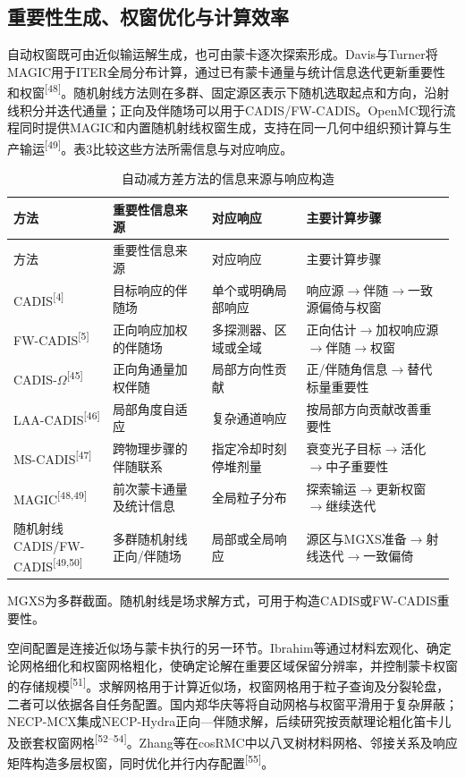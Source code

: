\documentclass[UTF8, zihao=-4, fontset=none, a4paper]{ctexart}
\newcommand{\upcite}[1]{\textsuperscript{[#1]}}
\begin{document}
\subsection{重要性生成、权窗优化与计算效率}

自动权窗既可由近似输运解生成，也可由蒙卡逐次探索形成。Davis与Turner将MAGIC用于ITER全局分布计算，通过已有蒙卡通量与统计信息迭代更新重要性和权窗\upcite{48}。随机射线方法则在多群、固定源区表示下随机选取起点和方向，沿射线积分并迭代通量；正向及伴随场可以用于CADIS/FW-CADIS。OpenMC现行流程同时提供MAGIC和内置随机射线权窗生成，支持在同一几何中组织预计算与生产输运\upcite{49}。表3比较这些方法所需信息与对应响应。 \begin{longtable}{@{}>{\raggedright\arraybackslash}p{0.22\linewidth}>{\raggedright\arraybackslash}p{0.22\linewidth}>{\raggedright\arraybackslash}p{0.21\linewidth}>{\raggedright\arraybackslash}p{0.33\linewidth}@{}}
\caption{自动减方差方法的信息来源与响应构造}\label{tab:3}\\
\toprule
方法 & 重要性信息来源 & 对应响应 & 主要计算步骤 \\
\midrule
\endfirsthead
\toprule
方法 & 重要性信息来源 & 对应响应 & 主要计算步骤 \\
\midrule
\endhead
\bottomrule
\endlastfoot
CADIS\upcite{4} & 目标响应的伴随场 & 单个或明确局部响应 & 响应源$\rightarrow$伴随$\rightarrow$一致源偏倚与权窗 \\
FW-CADIS\upcite{5} & 正向响应加权的伴随场 & 多探测器、区域或全域 & 正向估计$\rightarrow$加权响应源$\rightarrow$伴随$\rightarrow$权窗 \\
CADIS-$\Omega$\upcite{45} & 正向角通量加权伴随 & 局部方向性贡献 & 正/伴随角信息$\rightarrow$替代标量重要性 \\
LAA-CADIS\upcite{46} & 局部角度自适应 & 复杂通道响应 & 按局部方向贡献改善重要性 \\
MS-CADIS\upcite{47} & 跨物理步骤的伴随联系 & 指定冷却时刻停堆剂量 & 衰变光子目标$\rightarrow$活化$\rightarrow$中子重要性 \\
MAGIC\upcite{48,49} & 前次蒙卡通量及统计信息 & 全局粒子分布 & 探索输运$\rightarrow$更新权窗$\rightarrow$继续迭代 \\
随机射线CADIS/FW-CADIS\upcite{49,50} & 多群随机射线正向/伴随场 & 局部或全局响应 & 源区与MGXS准备$\rightarrow$射线迭代$\rightarrow$一致偏倚 \\
\end{longtable}

MGXS为多群截面。随机射线是场求解方式，可用于构造CADIS或FW-CADIS重要性。

空间配置是连接近似场与蒙卡执行的另一环节。Ibrahim等通过材料宏观化、确定论网格细化和权窗网格粗化，使确定论解在重要区域保留分辨率，并控制蒙卡权窗的存储规模\upcite{51}。求解网格用于计算近似场，权窗网格用于粒子查询及分裂轮盘，二者可以依据各自任务配置。国内郑华庆等将自动网格与权窗平滑用于复杂屏蔽；NECP-MCX集成NECP-Hydra正向---伴随求解，后续研究按贡献理论粗化笛卡儿及嵌套权窗网格\upcite{52--54}。Zhang等在cosRMC中以八叉树材料网格、邻接关系及响应矩阵构造多层权窗，同时优化并行内存配置\upcite{55}。
\end{document}
